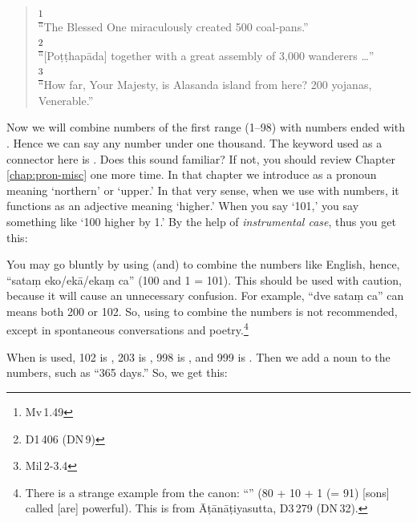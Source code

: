 \begin{quote}
\footnote{Mv\,1.49}\\
``The Blessed One miraculously created 500 coal-pans.''\\[1.5mm]
\footnote{D1\,406 (DN\,9)}\\
``[Po\d t\d thap\=ada] together with a great assembly of 3,000 wanderers \ldots''\\[1.5mm]
\footnote{Mil\,2-3.4}\\
``How far, Your Majesty, is Alasanda island from here? 200 yojanas, Venerable.''\\
\end{quote}

Now we will combine numbers of the first range (1--98) with numbers ended with . Hence we can say any number under one thousand. The keyword used as a connector here is . Does this sound familiar? If not, you should review Chapter \ref{chap:pron-misc} one more time. In that chapter we introduce  as a pronoun meaning `northern' or `upper.' In that very sense, when we use with numbers, it functions as an adjective meaning `higher.' When you say `101,' you say something like  `100 higher by 1.' By the help of \emph{instrumental case}, thus you get this:


You may go bluntly by using  (and) to combine the numbers like English, hence, ``sata\d m eko/ek\=a/eka\d m ca'' (100 and 1 = 101). This should be used with caution, because it will cause an unnecessary confusion. For example, ``dve sata\d m ca'' can means both 200 or 102. So, using  to combine the numbers is not recommended, except in spontaneous conversations and poetry.\footnote{There is a strange example from the canon: ``'' (80 + 10 + 1 (= 91) [sons] called  [are] powerful). This is from \=A\d t\=an\=a\d tiyasutta, D3\,279 (DN\,32).}

When  is used, 102 is , 203 is , 998 is , and 999 is . Then we add a noun to the numbers, such as ``365 days.'' So, we get this:


